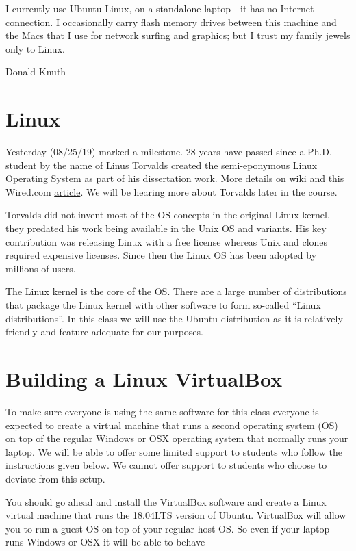
\epigraph{I currently use Ubuntu Linux, on a standalone laptop - it has no Internet connection. I occasionally carry flash memory drives between this machine and the Macs that I use for network surfing and graphics; but I trust my family jewels only to Linux.}{Donald Knuth}

\minitoc

\section{Linux}

Yesterday (08/25/19) marked a milestone. 28 years have passed since a Ph.D. student by the name of Linus Torvalds created the semi-eponymous Linux Operating System as part of his dissertation work. 
More details on \href{https://en.wikipedia.org/wiki/History_of_Linux}{wiki} and this Wired.com
\href{https://www.wired.com/2009/08/0825-torvalds-starts-linux/}{article}. We will be hearing more about Torvalds later in the course.

Torvalds did not invent most of the OS concepts in the original Linux kernel, they predated his work being available in the Unix OS and variants. His key contribution was  releasing Linux with a free license whereas Unix and clones required expensive licenses. Since then the Linux OS has been adopted by millions of users.

The Linux kernel is the core of the OS. There are a large number of distributions that package the Linux kernel with other software to form so-called ``Linux distributions''. In this class we will use the Ubuntu distribution as it is relatively friendly and feature-adequate for our purposes.

\section{Building a Linux VirtualBox}
To make sure everyone is using the same software for this class everyone is expected to create a virtual machine that runs a second operating system (OS) on top of the regular Windows or OSX operating system that normally runs your laptop. We will be able to offer some limited support to students who follow the instructions given below. We cannot offer support to students who choose to deviate from this setup.

You should go ahead and install the VirtualBox software and create a Linux virtual machine that runs the 18.04LTS version of Ubuntu. VirtualBox will allow you to run a guest OS on top of your regular host OS. So even if your laptop runs Windows or OSX it will be able to behave 


